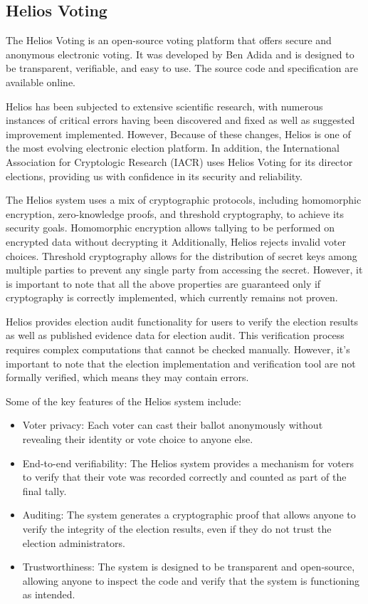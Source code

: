 \subsection{Helios Voting}
The Helios Voting is an open-source voting platform that offers secure and anonymous electronic voting. It was developed by Ben Adida \cite{Adida2008HeliosWO} and is designed to be transparent, verifiable, and easy to use. The source code and specification are available online.

Helios has been subjected to extensive scientific research, with numerous instances of critical errors having been discovered \cite{Heiderich2011TheBT, ChangFong2016TheCS, Cortier2011AttackingAF, Acemyan2015FromET, Bernhard2012HowNT, Bernhard2011AdaptingHF} and fixed as well as suggested improvement implemented. However, Because of these changes, Helios is one of the most evolving electronic election platform. In addition, the International Association for Cryptologic Research (IACR) \cite{iacr} uses Helios Voting for its director elections, providing us with confidence in its security and reliability.

The Helios system uses a mix of cryptographic protocols, including homomorphic encryption, zero-knowledge proofs, and threshold cryptography, to achieve its security goals. Homomorphic encryption allows tallying to be performed on encrypted data without decrypting it Additionally, Helios rejects invalid voter choices. Threshold cryptography allows for the distribution of secret keys among multiple parties to prevent any single party from accessing the secret. However, it is important to note that all the above properties are guaranteed only if cryptography is correctly implemented, which currently remains not proven.

Helios provides election audit functionality for users to verify the election results as well as published evidence data for election audit. This verification process requires complex computations that cannot be checked manually. However, it's important to note that the election implementation and verification tool are not formally verified, which means they may contain errors. 

Some of the key features of the Helios system include:

\begin{itemize}
    \item Voter privacy: Each voter can cast their ballot anonymously without revealing their identity or vote choice to anyone else.
    \item End-to-end verifiability: The Helios system provides a mechanism for voters to verify that their vote was recorded correctly and counted as part of the final tally.
    \item Auditing: The system generates a cryptographic proof that allows anyone to verify the integrity of the election results, even if they do not trust the election administrators.
    \item Trustworthiness: The system is designed to be transparent and open-source, allowing anyone to inspect the code and verify that the system is functioning as intended.
\end{itemize}

